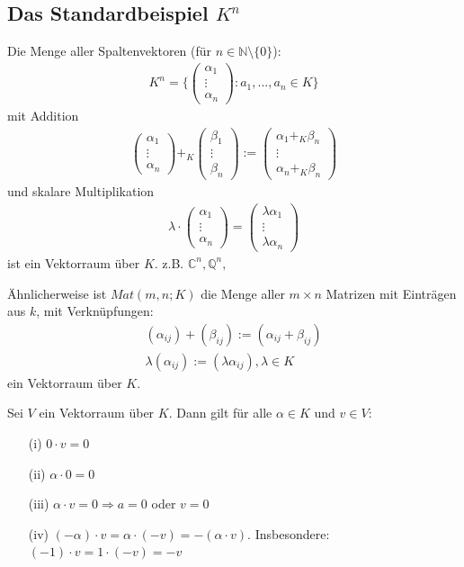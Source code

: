 \documentclass[11pt]{report}
\newcommand*\Zb[1] {\mathbb{#1}}
\begin{document}
\subsection{Das Standardbeispiel $K^n$}
Die Menge aller Spaltenvektoren (für $n \in \Zb{N}\setminus\{0\}$):
\begin{align}
 K^n = \{\begin{pmatrix}\alpha_{1} \\ \vdots \\ \alpha_n\end{pmatrix}: a_1, ..., a_n \in K\}
\end{align}
mit Addition
\begin{align}
\begin{pmatrix}
\alpha_{1} \\
\vdots \\
\alpha_n
\end{pmatrix} +_K
\begin{pmatrix}
\beta_{1} \\
\vdots \\
\beta_n
\end{pmatrix} :=
\begin{pmatrix}
\alpha_{1}+_K \beta_n \\
\vdots \\
\alpha_n +_K \beta_n
\end{pmatrix}
\end{align}
und skalare Multiplikation
\begin{align}
\lambda \cdot \begin{pmatrix}
\alpha_{1} \\
\vdots \\
\alpha_n
\end{pmatrix} = 
\begin{pmatrix}
\lambda \alpha_{1} \\
\vdots \\
\lambda\alpha_n
\end{pmatrix}
\end{align}
ist ein Vektorraum über $K$.
z.B. $\Zb{C}^n, \Zb{Q}^n,$

Ähnlicherweise ist $Mat(m, n; K)$ die Menge aller  $m \times n$ Matrizen mit Einträgen aus $k$, mit Verknüpfungen:
\begin{align}
 (\alpha_{ij}) + (\beta_{ij}) := (\alpha_{ij}+ \beta_{ij})\\
 \lambda(\alpha_{ij}) := (\lambda\alpha_{ij}), \lambda \in K
\end{align}
ein Vektorraum über $K$.\\
\begin{lemma}
 \label{lemma311}
Sei $V$ ein Vektorraum über $K$. Dann gilt für alle $\alpha \in K$ und $v \in V$:
\begin{itemize}
 \item[(i)] $0\cdot v = 0$
 \item[(ii)] $\alpha \cdot 0 = 0$
 \item[(iii)] $\alpha \cdot v = 0 \Rightarrow a=0$ oder $v=0$
 \item[(iv)] $(-\alpha)\cdot v = \alpha\cdot(-v) = -(\alpha\cdot v)$. Insbesondere: $(-1)\cdot v = 1 \cdot (-v) = -v$
\end{itemize}
\end{lemma}
\end{document}
